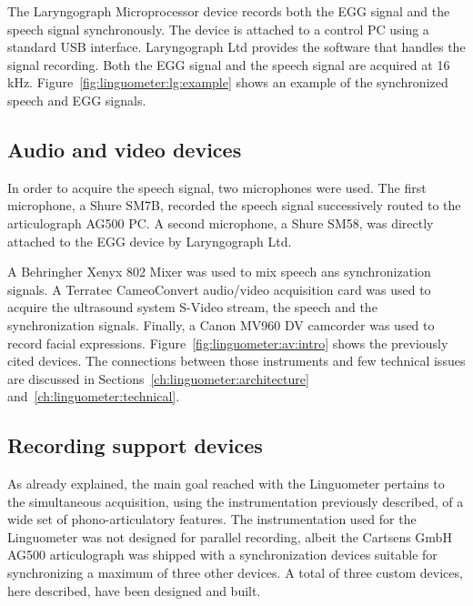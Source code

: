 The Laryngograph Microprocessor device records both the EGG signal and the
speech signal synchronously. The device is attached to a control PC using a
standard USB interface. Laryngograph Ltd provides the software that handles the
signal recording.
Both the EGG signal and the speech signal are acquired at 16 kHz. 
Figure~\ref{fig:linguometer:lg:example} shows an example of the synchronized
speech and EGG signals.
\subsection{Audio and video devices}
\label{ch:linguometer:instrumentation:av}
In order to acquire the speech signal, two microphones were used.
The first microphone, a Shure SM7B, recorded the speech signal successively
routed to the articulograph AG500 PC.
A second microphone, a Shure SM58, was directly attached to the EGG device
by Laryngograph Ltd.

A Behringher Xenyx 802 Mixer was used to mix speech ans synchronization signals.
A Terratec CameoConvert audio/video acquisition card was used to acquire the
ultrasound system S-Video stream, the speech and the synchronization signals.
Finally, a Canon MV960 DV camcorder was used to record facial expressions. 
Figure~\ref{fig:linguometer:av:intro} shows the previously cited devices.
The connections between those instruments and few technical issues are discussed
in Sections~\ref{ch:linguometer:architecture}
and~\ref{ch:linguometer:technical}.
\subsection{Recording support devices}
\label{ch:linguometer:instrumentation:custom}
As already explained, the main goal reached with the Linguometer pertains to the
simultaneous acquisition, using the instrumentation previously described, of
a wide set of phono-articulatory features.
The instrumentation used for the Linguometer was not designed for parallel
recording, albeit the Cartsens GmbH AG500 articulograph was shipped with a
synchronization devices suitable for synchronizing a maximum of three
other devices.
A total of three custom devices, here described, have been designed and built.

